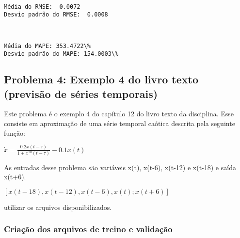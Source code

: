 \documentclass[11pt]{article}
\begin{document}
    \begin{center}
    \end{center}
    { \hspace*{\fill} \\}
    
    \begin{Verbatim}[commandchars=\\\{\}]
Média do RMSE:  0.0072
Desvio padrão do RMSE:  0.0008
    \end{Verbatim}

    \begin{center}
    \end{center}
    { \hspace*{\fill} \\}
    
    \begin{Verbatim}[commandchars=\\\{\}]
Média do MAPE: 353.4722\%
Desvio padrão do MAPE: 154.0003\%
    \end{Verbatim}

    \hypertarget{problema-4-exemplo-4-do-livro-texto-previsuxe3o-de-suxe9ries-temporais}{%
\subsection{Problema 4: Exemplo 4 do livro texto (previsão de séries
temporais)}\label{problema-4-exemplo-4-do-livro-texto-previsuxe3o-de-suxe9ries-temporais}}

Este problema é o exemplo 4 do capítulo 12 do livro texto da disciplina.
Esse consiste em aproximação de uma série temporal caótica descrita pela
seguinte função:

\(\dot{x} = \frac{0.2x(t - \tau)}{1+x^{10}(t-\tau)} - 0.1x(t)\)

As entradas desse problema são variáveis x(t), x(t-6), x(t-12) e x(t-18)
e saída x(t+6).

\([x(t-18), x(t-12), x(t-6), x(t); x(t+6)]\)

utilizar os arquivos disponibilizados.

\hypertarget{criauxe7uxe3o-dos-arquivos-de-treino-e-validauxe7uxe3o}{%
\subsubsection{Criação dos arquivos de treino e
validação}\label{criauxe7uxe3o-dos-arquivos-de-treino-e-validauxe7uxe3o}}
\end{document}
